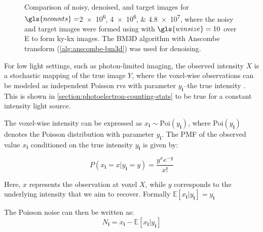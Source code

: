 \begin{figure}
    \caption{Comparison of noisy, denoised, and target images for $\gls{ncounts}=$\numlist{2e6;4e6;4.8e7}, where the noisy and target images were formed using with $\gls{winsize}=\num{10}$ over \gls{E} to form \gls{ky}-\gls{kx} images. The \gls{BM3D} algorithm with Anscombe transform (\cref{alg:anscombe-bm3d}) was used for denoising.}
    \label{fig:combined-noisy-denoised}
\end{figure}

For low light settings, such as photon-limited imaging, the observed intensity $X$ is a stochastic mapping  of the true image $Y$, where the voxel-wise observations can be modeled as independent Poisson \glspl{rv}  with parameter $y_{\mathbf{i}}$--the true intensity \cite{makitaloOptimalInversionAnscombe2011,kimDeepLearningbasedStatistical2021}. This is shown in \cref{section:photoelectron-counting-stats} to be true for a constant intensity light source. 

The voxel-wise intensity can be expressed as $x_{\mathbf{i}} \sim \text{Poi}(y_{\mathbf{i}})$, where $\text{Poi}(y_{\mathbf{i}})$ denotes the Poisson distribution with parameter $y_{\mathbf{i}}$. The \gls{PMF} of the observed value $x_{\mathbf{i}}$ conditioned on the true intensity $y_{\mathbf{i}}$ is given by:

\begin{equation}
    P(x_{\mathbf{i}} = x| y_{\mathbf{i}} = y) = \frac{y^x e^{-y}}{x!}
\end{equation}

Here, $x$ represents the observation at voxel $X$, while $y$ corresponds to the underlying intensity that we aim to recover. Formally $\mathbb{E}[x_{\mathbf{i}} | y_{\mathbf{i}}] = y_{\mathbf{i}}$

The Poisson noise can then be written as:
\begin{equation}
    N_{\mathbf{i}} = x_{\mathbf{i}} - \mathbb{E}[x_{\mathbf{i}} | y_{\mathbf{i}}]
\end{equation}

